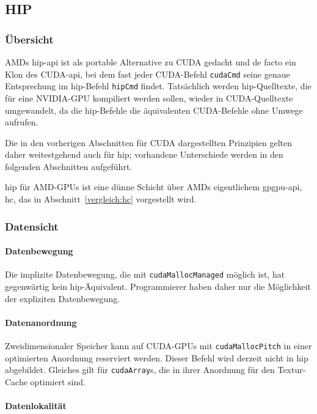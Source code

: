 \subsection{HIP}

\subsubsection{Übersicht}

AMDs \gls{hip}-\gls{api} ist als portable Alternative zu CUDA gedacht und de
facto ein Klon des CUDA-\gls{api}, bei dem fast jeder CUDA-Befehl
\texttt{cudaCmd} seine genaue Entsprechung im \gls{hip}-Befehl \texttt{hipCmd}
findet. Tatsächlich werden \gls{hip}-Quelltexte, die für eine NVIDIA-GPU
kompiliert werden sollen, wieder in CUDA-Quelltexte umgewandelt, da die
\gls{hip}-Befehle die äquivalenten CUDA-Befehle ohne Umwege aufrufen.

Die in den vorherigen Abschnitten für CUDA dargestellten Prinzipien gelten daher
weitestgehend auch für \gls{hip}; vorhandene Unterschiede werden in den
folgenden Abschnitten aufgeführt.

\gls{hip} für AMD-GPUs ist eine dünne Schicht über AMDs eigentlichem
\gls{gpgpu}-\gls{api}, \gls{hc}, das in Abschnitt~\ref{vergleich:hc} vorgestellt
wird.

\subsubsection{Datensicht}

\paragraph{Datenbewegung}

Die implizite Datenbewegung, die mit \texttt{cudaMallocManaged} möglich ist,
hat gegenwärtig kein \gls{hip}-Äquivalent. Programmierer haben daher nur die
Möglichkeit der expliziten Datenbewegung.

\paragraph{Datenanordnung}

Zweidimensionaler Speicher kann auf CUDA-GPUs mit \texttt{cudaMallocPitch} in
einer optimierten Anordnung reserviert werden. Dieser Befehl wird derzeit nicht
in \gls{hip} abgebildet. Gleiches gilt für \texttt{cudaArray}s, die in ihrer
Anordnung für den Textur-Cache optimiert sind.

\paragraph{Datenlokalität}

